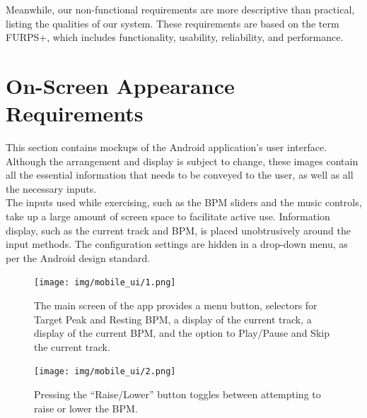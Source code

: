 \documentclass[letterpaper,english, 12pt]{scrreprt}
\begin{document}
Meanwhile, our non-functional requirements are more descriptive than practical,
listing the qualities of our system. These requirements are based on the term
FURPS+, which includes functionality, usability, reliability, and performance.

\section{On-Screen Appearance Requirements}

This section contains mockups of the Android application's user interface.
Although the arrangement and display is subject to change, these images contain all the essential information that needs to be conveyed to the user, as well as all the necessary inputs. \\
The inputs used while exercising, such as the BPM sliders and the music controls, take up a large amount of screen space to facilitate active use. Information display, such as the current track and BPM, is placed unobtrusively around the input methods. The configuration settings are hidden in a drop-down menu, as per the Android design standard.\\

\begin{figure}[H]
	\centering
	\texttt{[image: img/mobile\_ui/1.png]}\\
	\caption{The main screen of the app provides a menu button, selectors for Target Peak and Resting BPM, a display of the current track, a display of the current BPM, and the option to Play/Pause and Skip the current track.}
\end{figure}

\begin{figure}[H]
	\centering
	\texttt{[image: img/mobile\_ui/2.png]}\\
	\caption{Pressing the ``Raise/Lower'' button toggles between attempting to raise or lower the BPM.}
\end{figure}
\end{document}
